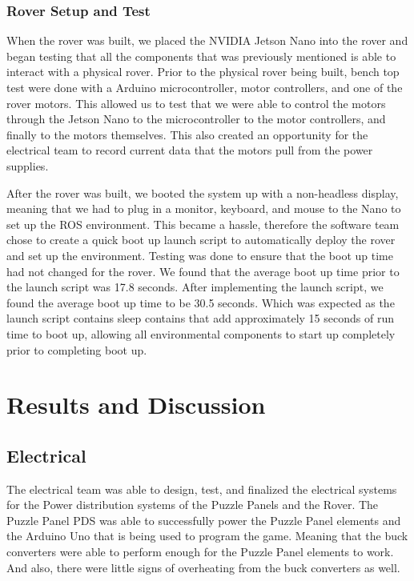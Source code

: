 \documentclass[a4paper, 10pt]{article}
\begin{document}
    \subsubsection*{Rover Setup and Test}
    When the rover was built, we placed the NVIDIA Jetson Nano into the rover and began testing that all the components that was previously mentioned is able to interact with a physical rover. Prior to the physical rover being built, bench top test were done with a Arduino microcontroller, motor controllers, and one of the rover motors. This allowed us to test that we were able to control the motors through the Jetson Nano to the microcontroller to the motor controllers, and finally to the motors themselves. This also created an opportunity for the electrical team to record current data that the motors pull from the power supplies. 

    After the rover was built, we booted the system up with a non-headless display, meaning that we had to plug in a monitor, keyboard, and mouse to the Nano to set up the ROS environment. This became a hassle, therefore the software team chose to create a quick boot up launch script to automatically deploy the rover and set up the environment. Testing was done to ensure that the boot up time had not changed for the rover.
    We found that the average boot up time prior to the launch script was 17.8 seconds. 
    After implementing the launch script, we found the average boot up time to be 30.5 seconds. Which was expected as the launch script contains sleep contains that add approximately 15 seconds of run time to boot up, allowing all environmental components to start up completely prior to completing boot up.

\section{Results and Discussion}
	
	\subsection{Electrical}
	The electrical team was able to design, test, and finalized the electrical systems for the Power distribution systems of the Puzzle Panels and the Rover. The Puzzle Panel PDS was able to successfully power the Puzzle Panel elements and the Arduino Uno that is being used to program the game. Meaning that the buck converters were able to perform enough for the Puzzle Panel elements to work. And also, there were little signs of overheating from the buck converters as well. 
	
\end{document}
